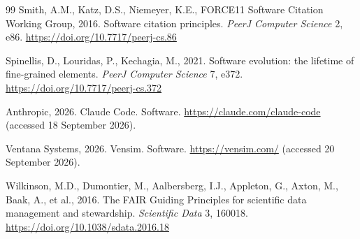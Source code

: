 \documentclass[3p,times,authoryear,twocolumn]{elsarticle}
\begin{document}
\begin{thebibliography}{99}
Smith, A.M., Katz, D.S., Niemeyer, K.E., FORCE11 Software Citation Working Group, 2016. Software citation principles. \emph{PeerJ Computer Science} 2, e86. \url{https://doi.org/10.7717/peerj-cs.86}

Spinellis, D., Louridas, P., Kechagia, M., 2021. Software evolution: the lifetime of fine-grained elements. \emph{PeerJ Computer Science} 7, e372. \url{https://doi.org/10.7717/peerj-cs.372}

Anthropic, 2026. Claude Code. Software. \url{https://claude.com/claude-code} (accessed 18 September 2026).

Ventana Systems, 2026. Vensim. Software. \url{https://vensim.com/} (accessed 20 September 2026).

Wilkinson, M.D., Dumontier, M., Aalbersberg, I.J., Appleton, G., Axton, M., Baak, A., et al., 2016. The FAIR Guiding Principles for scientific data management and stewardship. \emph{Scientific Data} 3, 160018. \url{https://doi.org/10.1038/sdata.2016.18}


\end{thebibliography}
% 
\end{document}
